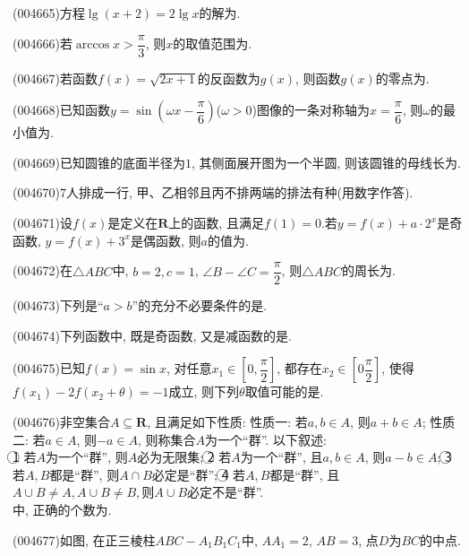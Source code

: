\item (004665)方程$\lg (x+2)=2\lg x$的解为.
\item (004666)若$\arccos x>\dfrac{\pi}3$, 则$x$的取值范围为.
\item (004667)若函数$f(x)=\sqrt{2x+1}$的反函数为$g(x)$, 则函数$g(x)$的零点为.
\item (004668)已知函数$y=\sin (\omega x-\dfrac{\pi}6)$($\omega >0$)图像的一条对称轴为$x=\dfrac{\pi}6$, 则$\omega$的最小值为.
\item (004669)已知圆锥的底面半径为$1$, 其侧面展开图为一个半圆, 则该圆锥的母线长为.
\item (004670)$7$人排成一行, 甲、乙相邻且丙不排两端的排法有种(用数字作答).
\item (004671)设$f(x)$是定义在$\mathbf{R}$上的函数, 且满足$f(1)=0$.若$y=f(x)+a\cdot 2^x$是奇函数, $y=f(x)+3^x$是偶函数, 则$a$的值为.
\item (004672)在$\triangle ABC$中, $b=2,c=1$, $\angle B-\angle C=\dfrac{\pi}2$, 则$\triangle ABC$的周长为.
\item (004673)下列是``$a>b$''的充分不必要条件的是.
\item (004674)下列函数中, 既是奇函数, 又是减函数的是.
\item (004675)已知$f(x)=\sin x$, 对任意$x_1 \in[0,\dfrac{\pi}2]$, 都存在$x_2\in [ 0\dfrac{\pi}2]$, 使得$f(x_1)-2f(x_2+\theta)=-1$成立, 则下列$\theta$取值可能的是.
\item (004676)非空集合$A\subseteq \mathbf{R}$, 且满足如下性质:
性质一: 若$a,b\in A$, 则$a+b\in A$;
性质二: 若$a\in A$, 则$-a\in A$, 则称集合$A$为一个``群''. 以下叙述:\\
\textcircled{1} 若$A$为一个``群'', 则$A$必为无限集;
\textcircled{2} 若$A$为一个``群'', 且$a,b\in A$, 则$a-b\in A$;
\textcircled{3} 若$A,B$都是``群'', 则$A\cap B$必定是``群'';
\textcircled{4} 若$A,B$都是``群'', 且$A\cup B\ne A,A\cup B\ne B,$则$A\cup B$必定不是``群''.\\
中, 正确的个数为.
\item (004677)如图, 在正三棱柱$ABC-A_1B_1C_1$中, $AA_1=2$, $AB=3$, 点$D$为$BC$的中点.
\begin{center}
\end{center}

